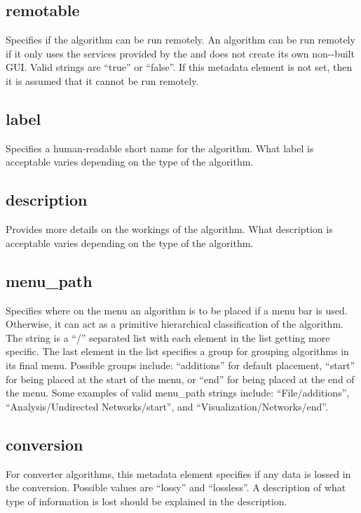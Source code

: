 \subsection*{remotable}
Specifies if the algorithm can be run remotely. An algorithm can be run
remotely if it only uses the services provided by the 
and does not create its own non--built GUI. Valid
strings are ``true'' or ``false''. If this metadata element is not set, then
it is assumed that it cannot be run remotely.

\subsection*{label}
Specifies a human-readable short name for the algorithm. What label is
acceptable varies depending on the type of the algorithm. 

\subsection*{description}
Provides more details on the workings of the algorithm. What
description is acceptable varies depending on the type of the algorithm.

\subsection*{menu\_path}
Specifies where on the menu an algorithm is to be
placed if a menu bar is used. Otherwise, it can act as a primitive hierarchical
classification of the algorithm. The string is a ``/'' separated list with
each element in the list getting more specific. The last element in the list
specifies a group for grouping algorithms in its final menu. Possible groups
include: ``additions'' for default placement, ``start'' for being placed at
the start of the menu, or ``end'' for being placed at the end of the menu. Some
examples of valid menu\_path strings include: ``File/additions'',
``Analysis/Undirected Networks/start'', and ``Visualization/Networks/end''.

\subsection*{conversion}
For converter algorithms, this metadata element specifies if any data is
lossed in the conversion. Possible values are ``lossy'' and ``lossless''. A
description of what type of information is lost should be explained in the
description.


